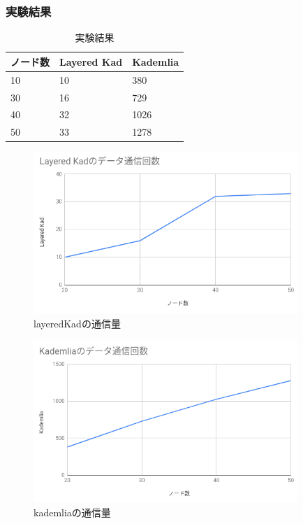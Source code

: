 \documentclass[sotsuron]{jcsie}
\begin{document}
\subsubsection{実験結果}

\begin{table}[H]
	\caption{実験結果}	
	\centering
	\label{table:traffic-result}
	\begin{tabular}{|l|l|l|}
		\hline
		ノード数 &   
		Layered Kad  &   
		Kademlia\\ 
		\hline
		10           &   
		10           &   
		380\\
		\hline
		30           &   
		16           &   
		729\\
		\hline
		40           &   
		32           &   
		1026\\
		\hline
		50           &   
		33           &   
		1278\\
		\hline
	\end{tabular}	
\end{table}

\begin{figure}[H]
	\centering
	\includegraphics[width=10cm]{./assets/image/layered-kad_traffic.png}
	\caption{layeredKadの通信量}	
\end{figure}

\begin{figure}[H]
	\centering
	\includegraphics[width=10cm]{./assets/image/kad_traffic.png}
	\caption{kademliaの通信量}	
\end{figure}
\end{document}
